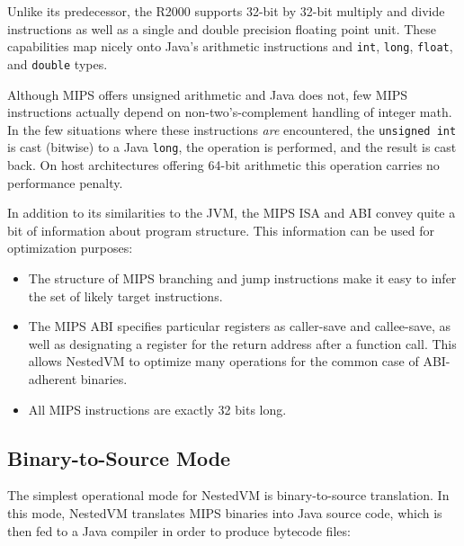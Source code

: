 \documentclass{acmconf}
\begin{document}
Unlike its predecessor, the R2000 supports 32-bit by 32-bit multiply
and divide instructions as well as a single and double precision
floating point unit.  These capabilities map nicely onto Java's
arithmetic instructions and {\tt int}, {\tt long}, {\tt float}, and
{\tt double} types.

Although MIPS offers unsigned arithmetic and Java does not, few MIPS
instructions actually depend on non-two's-complement handling of
integer math.  In the few situations where these instructions {\it
are} encountered, the {\tt unsigned int} is cast (bitwise) to a Java
{\tt long}, the operation is performed, and the result is cast back.
On host architectures offering 64-bit arithmetic this operation
carries no performance penalty.

In addition to its similarities to the JVM, the MIPS ISA and ABI
convey quite a bit of information about program structure.  This
information can be used for optimization purposes:

\begin{itemize}

\item The structure of MIPS branching and jump instructions make it
      easy to infer the set of likely target instructions.

\item The MIPS ABI specifies particular registers as caller-save and
      callee-save, as well as designating a register for the return
      address after a function call.  This allows NestedVM to optimize
      many operations for the common case of ABI-adherent binaries.

\item All MIPS instructions are exactly 32 bits long.

\end{itemize}



\subsection{Binary-to-Source Mode}

The simplest operational mode for NestedVM is binary-to-source
translation.  In this mode, NestedVM translates MIPS binaries into
Java source code, which is then fed to a Java compiler in order to
produce bytecode files:
\end{document}
